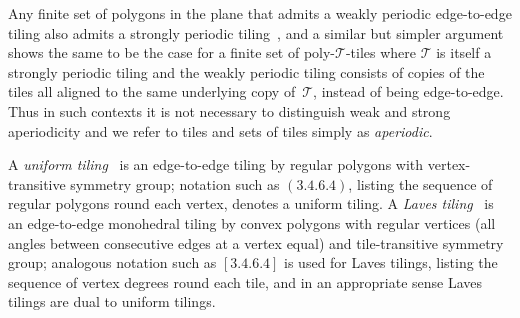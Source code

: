 Any finite set of polygons in the plane that admits a weakly periodic
edge-to-edge tiling also admits a strongly periodic
tiling~\cite[Theorem~3.7.1]{GS}, and a similar but simpler argument
shows the same to be the case for a finite set of
poly-$\mathcal{T}$-tiles where $\mathcal{T}$ is itself a strongly
periodic tiling and the weakly periodic tiling consists of copies 
of the
tiles all aligned to the same underlying copy of~$\mathcal{T}$,
instead of being edge-to-edge.  Thus in such contexts it is not
necessary to distinguish weak and strong aperiodicity and we refer to
tiles and sets of tiles simply as \emph{aperiodic}.

A \emph{uniform tiling}~\cite[Section~2.1]{GS} is an edge-to-edge
tiling by regular polygons with vertex-transitive symmetry group;
notation such as $(3.4.6.4)$, listing the sequence of regular polygons
round each vertex, denotes a uniform tiling.  A \emph{Laves
tiling}~\cite[Section~2.7]{GS} is an edge-to-edge monohedral tiling by
convex polygons with regular vertices (all angles between consecutive
edges at a vertex equal) and tile-transitive symmetry group; analogous
notation such as $[3.4.6.4]$ is used for Laves tilings, listing the
sequence of vertex degrees round each tile, and in an appropriate
sense Laves tilings are dual to uniform tilings.
